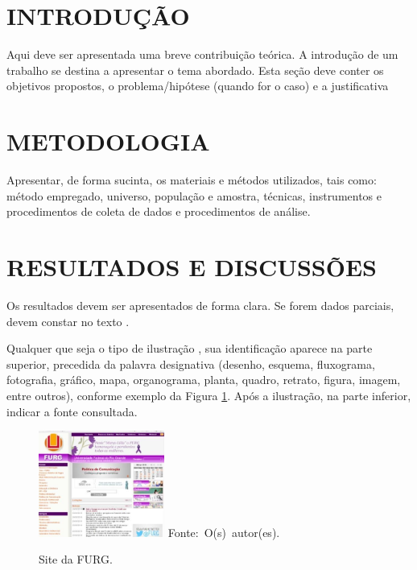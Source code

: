 \documentclass{furgmpu}
\begin{document}
    \maketitle
    
    
    \section{INTRODUÇÃO}
    Aqui deve ser apresentada uma breve contribuição teórica. A introdução de um trabalho se destina a apresentar o tema abordado. Esta seção deve conter os objetivos propostos, o problema/hipótese (quando for o caso) e a justificativa 

    \section{METODOLOGIA}
    Apresentar, de forma sucinta, os materiais e métodos utilizados, tais como: método empregado, universo, população e amostra, técnicas, instrumentos e procedimentos de coleta de dados e procedimentos de análise. 
    
    \section{RESULTADOS E DISCUSSÕES}
    Os resultados devem ser apresentados de forma clara. Se forem dados parciais, devem constar no texto \cite{exemplo01}.  
    
    Qualquer que seja o tipo de ilustração \cite{exemplo02}, sua identificação aparece na parte superior, precedida da palavra designativa (desenho, esquema, fluxograma, fotografia, gráfico, mapa, organograma, planta, quadro, retrato, figura, imagem, entre outros), conforme exemplo da Figura \ref{fig:exemplo}. Após a ilustração, na parte inferior, indicar a fonte consultada. 
    \begin{figure}[ht]
        \centering
        \caption{Site da FURG.}
        \includegraphics[width=4.13cm, scale=1]{exemplo.jpg}
        \mbox{Fonte: O(s) autor(es).}
        \label{fig:exemplo}
    \end{figure}
    
\end{document}
